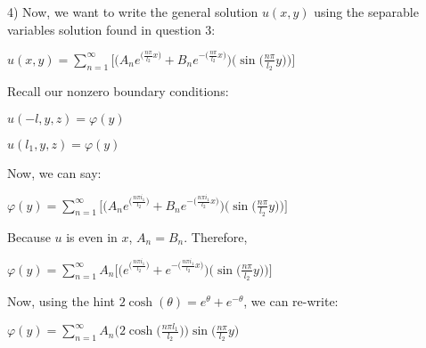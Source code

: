 \documentclass[executivepaper]{article}
\begin{document}
\begin{flushleft}

4) Now, we want to write the general solution $u(x,y)$ using the separable variables solution found in question 3:

\begin{center}

$u(x,y)=\sum_{n=1}^{\infty} \bigg[\bigg(A_{n} e^{\Big(\frac{n \pi}{l_{2}} x\Big)} + B_{n} e^{-\Big(\frac{n \pi}{l_{2}} x\Big)}\bigg) \bigg(\sin\bigg(\frac{n \pi}{l_{2}} y\bigg)\bigg)\bigg]$

\end{center}

Recall our nonzero boundary conditions:

\begin{center}

$u(-l, y, z)=\varphi(y)$

\vspace{2mm}

$u(l_{1}, y, z)=\varphi(y)$

\end{center}

Now, we can say:

\begin{center}

$\varphi(y)=\sum_{n=1}^{\infty} \bigg[\bigg(A_{n} e^{\Big(\frac{n \pi i_{1}}{l_{2}} \Big)} + B_{n} e^{-\Big(\frac{n \pi i_{1}}{l_{2}} x\Big)}\bigg) \bigg(\sin\bigg(\frac{n \pi}{l_{2}} y\bigg)\bigg)\bigg]$

\end{center}

Because $u$ is even in $x$, $A_{n}=B_{n}$. Therefore,

\begin{center}

$\varphi(y)=\sum_{n=1}^{\infty} A_{n} \bigg[\bigg(e^{\Big(\frac{n \pi i_{1}}{l_{2}} \Big)} + e^{-\Big(\frac{n \pi i_{1}}{l_{2}} x\Big)}\bigg) \bigg(\sin\bigg(\frac{n \pi}{l_{2}} y\bigg)\bigg)\bigg]$

\end{center}

Now, using the hint $2\cosh(\theta)=e^{\theta}+e^{-\theta}$, we can re-write:

\begin{center}

$\varphi(y)=\sum_{n=1}^{\infty} A_{n} \bigg(2\cosh\bigg(\frac{n \pi l_{1}}{l_{2}}\bigg)\bigg) \sin\bigg(\frac{n \pi}{l_{2}} y\bigg)$

\end{center}


\end{flushleft}
\end{document}

